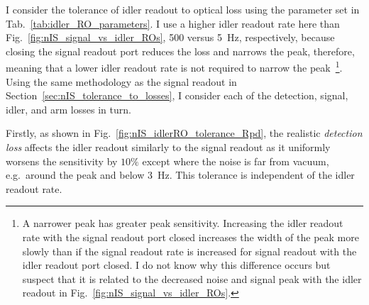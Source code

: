 I consider the tolerance of idler readout to optical loss using the parameter set in Tab.~\ref{tab:idler_RO_parameters}. I use a higher idler readout rate here than Fig.~\ref{fig:nIS_signal_vs_idler_ROs}, 500 versus 5~Hz, respectively, because closing the signal readout port reduces the loss and narrows the peak, therefore, meaning that a lower idler readout rate is not required to narrow the peak~\footnote{A narrower peak has greater peak sensitivity. Increasing the idler readout rate with the signal readout port closed increases the width of the peak more slowly than if the signal readout rate is increased for signal readout with the idler readout port closed. I do not know why this difference occurs but suspect that it is related to the decreased noise and signal peak with the idler readout in Fig.~\ref{fig:nIS_signal_vs_idler_ROs}.}.
Using the same methodology as the signal readout in Section~\ref{sec:nIS_tolerance_to_losses}, I consider each of the detection, signal, idler, and arm losses in turn.

Firstly, as shown in Fig.~\ref{fig:nIS_idlerRO_tolerance_Rpd}, the realistic \emph{detection loss} affects the idler readout similarly to the signal readout as it uniformly worsens the sensitivity by $10\%$ except where the noise is far from vacuum, e.g.\ around the peak and below 3~Hz. %
This tolerance is independent of the idler readout rate. %


